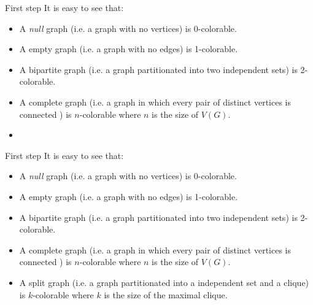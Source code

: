 \documentclass[9pt, compress]{beamer}
\newcommand{\?}{\textcolor{warn}{\textit{?}}}
\begin{document}
    \begin{frame}{First step}
      It is easy to see that:
      \begin{itemize}
        \item A \emph{null} graph (i.e. a graph with no vertices) is 0-colorable.
        \item A empty graph (i.e. a graph with no edges) is 1-colorable.
        \item A bipartite graph (i.e. a graph partitionated into two independent sets) is 2-colorable.
        \item A complete graph (i.e. a graph in which every pair of distinct vertices is connected ) is $n$-colorable where $n$ is the size of $V(G)$.
        \item                                                                                                               
      \end{itemize}
    \end{frame}
    \begin{frame}{First step}
      It is easy to see that:
      \begin{itemize}
        \item A \emph{null} graph (i.e. a graph with no vertices) is 0-colorable.
        \item A empty graph (i.e. a graph with no edges) is 1-colorable.
        \item A bipartite graph (i.e. a graph partitionated into two independent sets) is 2-colorable.
        \item A complete graph (i.e. a graph in which every pair of distinct vertices is connected ) is $n$-colorable where $n$ is the size of $V(G)$.
        \item A split graph (i.e. a graph partitionated into a independent set and a clique) is $k$-colorable where $k$ is the size of the maximal clique.
      \end{itemize}
    \end{frame}
\end{document}
